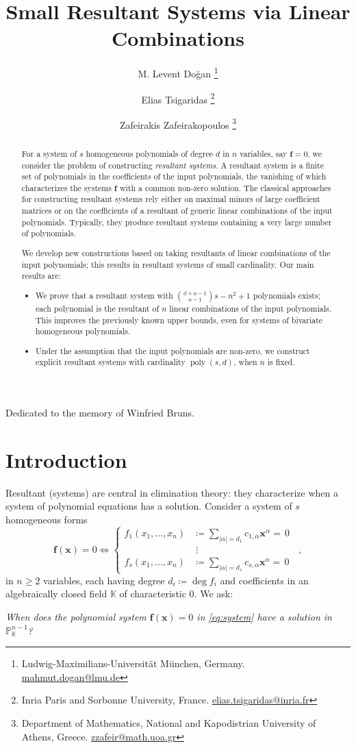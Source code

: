 \documentclass[11pt,a4paper]{article}
\title{Small Resultant Systems via Linear Combinations}
\author{
M. Levent Do\u{g}an 
\thanks{Ludwig-Maximilians-Universit\"{a}t M\"{u}nchen, Germany. \url{mahmut.dogan@lmu.de} }
\and 
Elias Tsigaridas 
\thanks{Inria Paris and Sorbonne University, France.
\url{elias.tsigaridas@inria.fr}
}
\and 
Zafeirakis Zafeirakopoulos \thanks{Department of Mathematics, National and Kapodistrian University of Athens, Greece. \url{zzafeir@math.uoa.gr}}}
\date{}
\numberwithin{equation}{section}
\newcommand{\PP}{\mathbb{P}}
\newcommand{\KK}{\mathbb{K}}
\newcommand{\xx}{\ensuremath{\boldsymbol{x}}}
\newcommand{\ff}{\ensuremath{\boldsymbol{f}}}
\DeclareMathOperator{\poly}{poly}
\begin{document}
\maketitle
{\centering\footnotesize Dedicated to the memory of Winfried Bruns.\par}

\begin{abstract}
	For a system of $s$ homogeneous polynomials of degree $d$ in $n$ variables, say $\ff = 0$,
	we consider the problem of constructing \emph{resultant systems}.
	A resultant system is a finite set of polynomials in the coefficients of the input polynomials, the vanishing of which characterizes the systems $\ff$ with a common non-zero solution.
The classical approaches for constructing resultant systems rely either on maximal minors of large coefficient matrices or on the coefficients of a resultant of generic linear combinations of the input polynomials.
Typically, they produce resultant systems containing a very large number of polynomials.
    
We develop new constructions based on taking resultants of linear combinations of the input polynomials; 
this results in resultant systems of small cardinality.
Our main results are:
    \begin{itemize}
    \item We prove that a resultant system with $\binom{d+n-1}{n-1}s-n^2+1$ polynomials exists; each polynomial is the resultant of $n$ linear combinations of the input polynomials.
    This improves the previously known upper bounds, even for systems of bivariate homogeneous polynomials.
    \item Under the assumption that the input polynomials are non-zero,
    we construct explicit resultant systems with cardinality $\poly(s,d)$, when $n$ is fixed.
    \end{itemize}
\end{abstract}

\tableofcontents


\section{Introduction}
Resultant (systems) are central in elimination theory: they characterize when a system of polynomial equations has a solution.
Consider a system of $s$ homogeneous forms 
\begin{equation}
\label{eq:system}
\ff(\xx) = 0 \Leftrightarrow
\begin{cases}
    f_1(x_1, \dots, x_n) &\coloneqq \sum_{|\alpha|=d_1} c_{1,\alpha} \xx^{\alpha} =\,0 \\
    &\;\vdots  \\
    f_s(x_1, \dots, x_n) &\coloneqq \sum_{|\alpha|=d_s} c_{s,\alpha} \xx^{\alpha} =\,0
\end{cases} \enspace,
\end{equation}
in $n\geq 2$ variables,
each having degree $d_i\coloneqq \deg f_i$
and coefficients in an algebraically closed field $\KK$ of characteristic $0$.
We ask: 
\begin{center}
	\emph{When does the polynomial system $\ff(\xx) = 0$ in \eqref{eq:system}
	have a solution in  $\PP^{n-1}_{\KK}$?}
\end{center}
\end{document}

